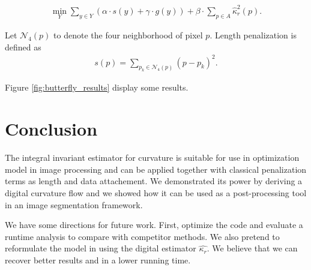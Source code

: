 \documentclass[runningheads]{llncs}
\begin{document}
\begin{align}			
	\min_{Y} \sum_{y \in Y}{\left( \alpha \cdot s(y) + \gamma \cdot g(y) \right)} + \beta \cdot \sum_{p \in A}{\hat{\kappa}_{r}^2(p)}.
	\label{eq:boundary-correction-energy}
\end{align}
	
	Let $\mathcal{N}_4(p)$ to denote the four neighborhood of pixel $p$. Length penalization is defined as
	\begin{align*}
		s(p)=\sum_{p_k \in \mathcal{N}_4(p)}{ (p-p_k) }^2.
	\end{align*}


Figure \ref{fig:butterfly_results} display some results.

\section{Conclusion}
The integral invariant estimator for curvature is suitable for use in optimization model in image processing and can be applied together with classical penalization terms as length and data attachement. We demonstrated its power by deriving a digital curvature flow and we showed how it can be used as a post-processing tool in an image segmentation framework. 

We have some directions for future work. First, optimize the code and evaluate a runtime analysis to compare with competitor methods. We also pretend to reformulate the model in \cite{schoenemann09} using the digital estimator $\hat{\kappa_r}$. We believe that we can recover better results and in a lower running time.
	
\end{document}
